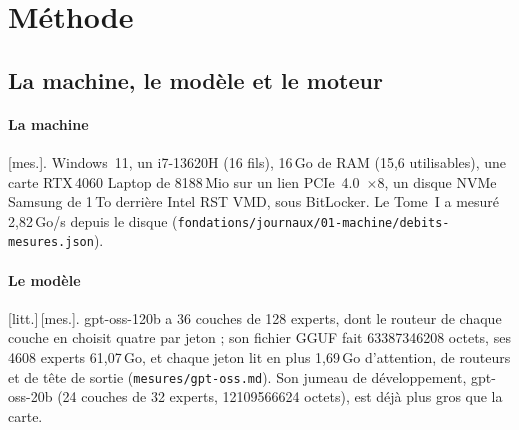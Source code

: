 \documentclass[11pt, a4paper]{article}
\theoremstyle{remark}
\newcommand{\etiq}[1]{\textsf{\scriptsize[#1]}}
\newcommand{\mes}{\etiq{mes.}}
\newcommand{\litt}{\etiq{litt.}}
\newcommand{\fichier}[1]{\textsf{\footnotesize\nolinkurl{#1}}}
\begin{document}
\section{Méthode}\label{sec-methode}

\subsection{La machine, le modèle et le moteur}\label{sec-moteur}

\paragraph{La machine} \mes. Windows~11, un i7-13620H (16 fils), 16\,Go de RAM (15,6 utilisables), une carte RTX\,4060 Laptop de \num{8188}\,Mio sur un lien PCIe~4.0~$\times 8$, un disque NVMe Samsung de 1\,To derrière Intel RST VMD, sous BitLocker. Le Tome~I a mesuré 2,82\,Go/s depuis le disque (\fichier{fondations/journaux/01-machine/debits-mesures.json}).

\paragraph{Le modèle} \litt\,\mes. gpt-oss-120b a 36 couches de 128 experts, dont le routeur de chaque couche en choisit quatre par jeton ; son fichier GGUF fait \num{63387346208} octets, ses \num{4608} experts 61,07\,Go, et chaque jeton lit en plus 1,69\,Go d'attention, de routeurs et de tête de sortie (\fichier{mesures/gpt-oss.md}). Son jumeau de développement, gpt-oss-20b (24 couches de 32 experts, \num{12109566624} octets), est déjà plus gros que la carte.
\end{document}
